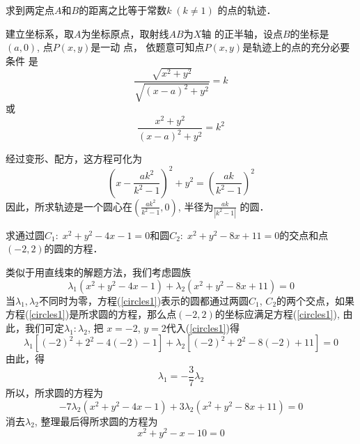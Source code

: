 \begin{example}
    求到两定点$A$和$B$的距离之比等于常数$k\; (k\ne 1)$
的点的轨迹．
\end{example}

\begin{figure}[htp]
    \centering
{}
    \caption{}
\end{figure}

\begin{solution}
    建立坐标系，取$A$为坐标原点，取射线$AB$为$X$轴
的正半轴，设点$B$的坐标是$(a,0)$, 点$P(x,y)$是一动
点，
依题意可知点$P(x,y)$是轨迹上的点的充分必要条件
是
\[\frac{\sqrt{x^2+y^2}}{\sqrt{(x-a)^2+y^2}}=k\]
或
\[\frac{{x^2+y^2}}{{(x-a)^2+y^2}}=k^2\]

经过变形、配方，这方程可化为
\[\left(x-\frac{ak^2}{k^2-1}\right)^2+y^2=\left(\frac{ak}{k^2-1}\right)^2\]
因此，所求轨迹是一个圆心在$\left(\frac{ak^2}{k^2-1},0\right)$,
半径为$\frac{ak}{|k^2-1|}$
的圆．
\end{solution}

\begin{example}
    求通过圆$C_1:\; x^2+y^2-4x-1=0$和圆$C_2:\; x^2+
y^2-8x+11=0$的交点和点$(-2,2)$的圆的方程．
\end{example}

\begin{solution}
类似于用直线束的解题方法，我们考虑圆族
\begin{equation}\label{circles1}
    \lambda_1(x^2+y^2-4x-1)+\lambda_2(x^2+y^2-8x+11)=0
\end{equation}
当$\lambda_1,\lambda_2$不同时为零，方程(\ref{circles1})表示的圆都通过两圆$C_1$, 
$C_2$的两个交点，如果方程(\ref{circles1})是所求圆的方程，那么点$(-2,2)$的坐标应满足方程(\ref{circles1}), 由此，我们可定$\lambda_1:\lambda_2$, 把
$x=-2$, $y=2$代入(\ref{circles1})得
\[\lambda_1[(-2)^2+2^2-4(-2)-1]+\lambda_2[(-2)^2+2^2-8(-2)+11]=0\]
由此，得
\[\lambda_1=-\frac{3}{7}\lambda_2\]
所以，所求圆的方程为
\[-7\lambda_2(x^2+y^2-4x-1)+3\lambda_2(x^2+y^2-8x+11)=0\]
消去$\lambda_2$, 整理最后得所求圆的方程为
\[x^2+y^2-x-10=0\]
\end{solution}


